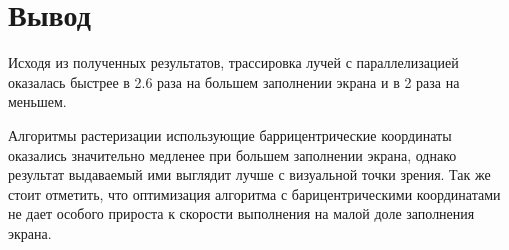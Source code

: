 \section*{Вывод}
Исходя из полученных результатов, трассировка лучей с параллелизацией оказалась быстрее в 2.6 раза на большем заполнении экрана и в 2 раза на меньшем. 

Алгоритмы растеризации использующие баррицентрические координаты оказались значительно медленее при большем заполнении экрана, однако результат выдаваемый ими выглядит лучше с визуальной точки зрения. Так же стоит отметить, что оптимизация алгоритма с барицентрическими координатами не дает особого прироста к скорости выполнения на малой доле заполнения экрана. 
